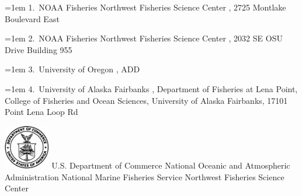 \documentclass[
]{scrartcl}
\begin{document}
\begin{titlepage}
\begin{minipage}[b][\textheight][s]{\textwidth}
  \hangindent=1em
  {1}.~{NOAA Fisheries Northwest Fisheries Science Center}%
  , %
  {2725 Montlake Boulevard East}%
  \par\hangindent=1em%
  {2}.~{NOAA Fisheries Northwest Fisheries Science Center}%
  , %
  {2032 SE OSU Drive Building 955}%
  \par\hangindent=1em%
  {3}.~{University of Oregon}%
  , %
  {ADD}%
  \par\hangindent=1em%
  {4}.~{University of Alaska Fairbanks}%
  , %
  {Department of Fisheries at Lena Point, College of Fisheries and Ocean
  Sciences, University of Alaska Fairbanks, 17101 Point Lena Loop Rd}%


  \vspace{1\baselineskip}



  \vfill


  \vspace{1\baselineskip}

  \includegraphics[alt={},width=2cm]{support_files/us_doc_logo.png}\newline %
  U.S. Department of Commerce\newline
  National Oceanic and Atmospheric Administration\newline
  National Marine Fisheries Service\newline
  Northwest Fisheries Science Center\newline

  \end{minipage}
  \restoregeometry
  \end{titlepage}
\end{document}

